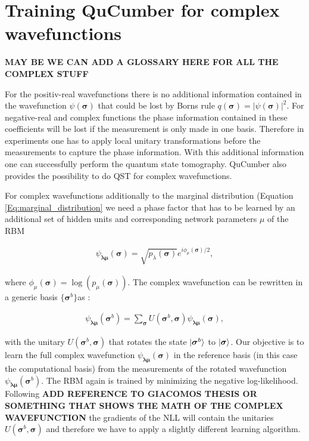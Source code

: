\documentclass[submission, Phys]{SciPost}
\begin{document}
\section{Training QuCumber for complex wavefunctions}

\textbf{MAY BE WE CAN ADD A GLOSSARY HERE FOR ALL THE COMPLEX STUFF}

For the positiv-real wavefunctions there is no additional information contained in the wavefunction $\psi( \boldsymbol{\sigma})$ that could be lost by Borns rule $q(\boldsymbol{\sigma}) = | \psi( \boldsymbol{\sigma} ) |^2$. For negative-real and complex functions the phase information contained in these coefficients will be lost if the measurement is only made in one basis. Therefore in experiments one has to apply local unitary transformations before the measurements to capture the phase information. With this additional information one can successfully perform the quantum state tomography.
QuCumber also provides the possibility to do QST for complex wavefunctions.

For complex wavefunctions additionally to the marginal distribution (Equation \ref{Eq:marginal_distribution} we need a phase factor that has to be learned by an additional set of hidden units and corresponding network parameters $\mu$ of the RBM

\begin{align}
\psi_{\bm{\lambda} \bm{\mu}} (\bm{\sigma})= \sqrt{p_{\lambda} (\bm{\sigma})} e^{i \phi_{\mu} (\bm{\sigma})/2},
\end{align}

where $\phi_{\mu}(\bm{\sigma}) = \log (p_{\mu} (\bm{\sigma}))$. The complex wavefunction can be rewritten in a generic basis $\{ \bm{\sigma}^b \}$as :

\begin{align}
\psi_{\bm{\lambda} \bm{\mu}} (\bm{\sigma}^b)= \sum_{\bm{\sigma}} U (\bm{\sigma}^b, \bm{\sigma}) \psi_{\bm{\lambda} \bm{\mu}} (\bm{\sigma}),
\end{align}

with the unitary $U (\bm{\sigma}^b, \bm{\sigma})$ that rotates the state $\ket{\bm{\sigma}^b}$ to $\ket{\bm{\sigma}}$. Our objective is to learn the full complex wavefunction $\psi_{\bm{\lambda} \bm{\mu}} (\bm{\sigma})$ in the reference basis (in this case the computational basis) from the measurements of the rotated wavefunction $\psi_{\bm{\lambda} \bm{\mu}} (\bm{\sigma}^b)$.
The RBM again is trained by minimizing the negative log-likelihood. Following \cite{} \textbf{ADD REFERENCE TO GIACOMOS THESIS OR SOMETHING THAT SHOWS THE MATH OF THE COMPLEX WAVEFUNCTION} the gradients of the NLL will contain the unitaries $U (\bm{\sigma}^b, \bm{\sigma})$ and therefore we have to apply a slightly different learning algorithm.
\end{document}
